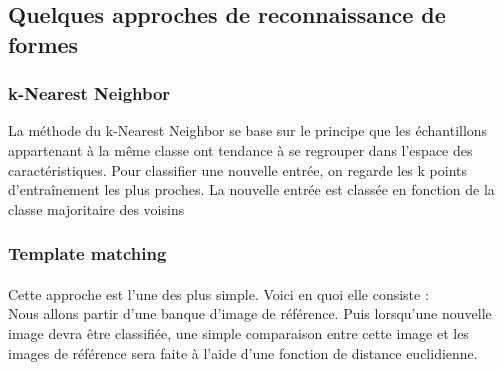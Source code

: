 \documentclass[a4paper]{article}
\begin{document}

		\subsection{Quelques approches de reconnaissance de formes}
			\subsubsection{k-Nearest Neighbor}
				La méthode du k-Nearest Neighbor se base sur le principe que les échantillons appartenant à la même classe ont tendance à se regrouper dans l'espace des caractéristiques.
				Pour classifier une nouvelle entrée, on regarde les k points d'entraînement les plus proches. La nouvelle entrée est classée en fonction de la classe majoritaire des voisins
			\subsubsection{Template matching} 
				\paragraph{}
					Cette approche est l'une des plus simple. Voici en quoi elle consiste :\\Nous allons partir d'une banque d'image de référence. Puis lorsqu'une nouvelle image devra être classifiée, une simple comparaison entre cette image et les images de référence sera faite à l'aide d'une fonction de distance euclidienne.
\end{document}
